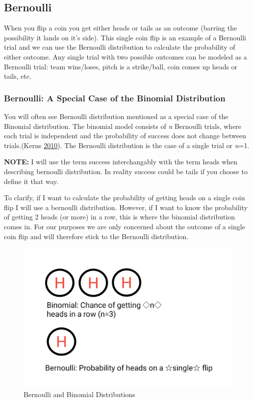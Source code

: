 \documentclass[]{book}
\theoremstyle{definition}
\theoremstyle{definition}
\theoremstyle{definition}
\theoremstyle{remark}
\begin{document}
\subsection{Bernoulli}\label{bernoulli}

When you flip a coin you get either heads or tails as an outcome
(barring the possibility it lands on it's side). This single coin flip
is an example of a Bernoulli trial and we can use the Bernoulli
distribution to calculate the probability of either outcome. Any single
trial with two possible outcomes can be modeled as a Bernoulli trial:
team wins/loses, pitch is a strike/ball, coin comes up heads or tails,
etc.

\subsubsection{Bernoulli: A Special Case of the Binomial
Distribution}\label{bernoulli-a-special-case-of-the-binomial-distribution}

You will often see Bernoulli distribution mentioned as a special case of
the Binomial distribution. The binomial model consists of \emph{n}
Bernoulli trials, where each trial is independent and the probability of
success does not change between trials.(Kerns
\protect\hyperlink{ref-kerns2010introduction}{2010}). The Bernoulli
distribution is the case of a single trial or \emph{n}=1.

\textbf{NOTE:} I will use the term success interchangably with the term
heads when describing bernoulli distribution. In reality success could
be tails if you choose to define it that way.

To clarify, if I want to calculate the probability of getting heads on a
single coin flip I will use a bernoulli distribution. However, if I want
to know the probability of getting 2 heads (or more) in a row, this is
where the binomial distribution comes in. For our purposes we are only
concerned about the outcome of a single coin flip and will therefore
stick to the Bernoulli distribution.

\begin{figure}
\centering
\includegraphics{Images/Bern_Binomial.png}
\caption{\label{fig:BernVSBin}Bernoulli and Binomial Distributions}
\end{figure}
\end{document}

